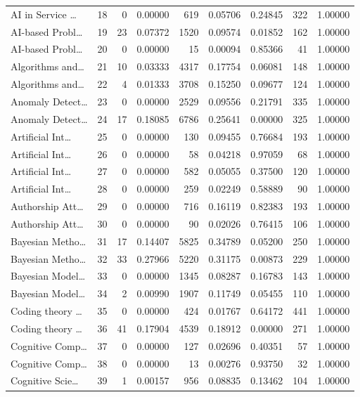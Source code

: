 \begin{table}
\begin{tabular}{lrrrrrrrr}
AI in Service … & 18 & 0 & 0.00000 & 619 & 0.05706 & 0.24845 & 322 & 1.00000 \\
AI-based Probl… & 19 & 23 & 0.07372 & 1520 & 0.09574 & 0.01852 & 162 & 1.00000 \\
AI-based Probl… & 20 & 0 & 0.00000 & 15 & 0.00094 & 0.85366 & 41 & 1.00000 \\
Algorithms and… & 21 & 10 & 0.03333 & 4317 & 0.17754 & 0.06081 & 148 & 1.00000 \\
Algorithms and… & 22 & 4 & 0.01333 & 3708 & 0.15250 & 0.09677 & 124 & 1.00000 \\
Anomaly Detect… & 23 & 0 & 0.00000 & 2529 & 0.09556 & 0.21791 & 335 & 1.00000 \\
Anomaly Detect… & 24 & 17 & 0.18085 & 6786 & 0.25641 & 0.00000 & 325 & 1.00000 \\
Artificial Int… & 25 & 0 & 0.00000 & 130 & 0.09455 & 0.76684 & 193 & 1.00000 \\
Artificial Int… & 26 & 0 & 0.00000 & 58 & 0.04218 & 0.97059 & 68 & 1.00000 \\
Artificial Int… & 27 & 0 & 0.00000 & 582 & 0.05055 & 0.37500 & 120 & 1.00000 \\
Artificial Int… & 28 & 0 & 0.00000 & 259 & 0.02249 & 0.58889 & 90 & 1.00000 \\
Authorship Att… & 29 & 0 & 0.00000 & 716 & 0.16119 & 0.82383 & 193 & 1.00000 \\
Authorship Att… & 30 & 0 & 0.00000 & 90 & 0.02026 & 0.76415 & 106 & 1.00000 \\
Bayesian Metho… & 31 & 17 & 0.14407 & 5825 & 0.34789 & 0.05200 & 250 & 1.00000 \\
Bayesian Metho… & 32 & 33 & 0.27966 & 5220 & 0.31175 & 0.00873 & 229 & 1.00000 \\
Bayesian Model… & 33 & 0 & 0.00000 & 1345 & 0.08287 & 0.16783 & 143 & 1.00000 \\
Bayesian Model… & 34 & 2 & 0.00990 & 1907 & 0.11749 & 0.05455 & 110 & 1.00000 \\
Coding theory … & 35 & 0 & 0.00000 & 424 & 0.01767 & 0.64172 & 441 & 1.00000 \\
Coding theory … & 36 & 41 & 0.17904 & 4539 & 0.18912 & 0.00000 & 271 & 1.00000 \\
Cognitive Comp… & 37 & 0 & 0.00000 & 127 & 0.02696 & 0.40351 & 57 & 1.00000 \\
Cognitive Comp… & 38 & 0 & 0.00000 & 13 & 0.00276 & 0.93750 & 32 & 1.00000 \\
Cognitive Scie… & 39 & 1 & 0.00157 & 956 & 0.08835 & 0.13462 & 104 & 1.00000 \\

\end{tabular}
\end{table}
